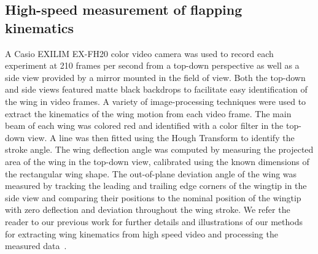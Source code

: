 \documentclass{article}
\begin{document}
\subsection*{High-speed measurement of flapping kinematics}
A Casio EXILIM EX-FH20 color video camera was used to record each experiment at
210 frames per second from a top-down perspective as well as a side view
provided by a mirror mounted in the field of view. Both the top-down and side
views featured matte black backdrops to facilitate easy identification of the
wing in video frames. A variety of image-processing techniques were used to
extract the kinematics of the wing motion from each video frame. The main beam
of each wing was colored red and identified with a color filter in the top-down
view. A line was then fitted using the Hough Transform to identify the stroke
angle. The wing deflection angle was computed by measuring the projected area of
the wing in the top-down view, calibrated using the known dimensions of the
rectangular wing shape. The out-of-plane deviation angle of the wing was
measured by tracking the leading and trailing edge corners of the wingtip in the
side view and comparing their positions to the nominal position of the wingtip
with zero deflection and deviation throughout the wing stroke. We refer the
reader to our previous work for further details and illustrations of our methods
for extracting wing kinematics from high speed video and processing the measured
data~\cite{richter2012thesis}.





\end{document}
